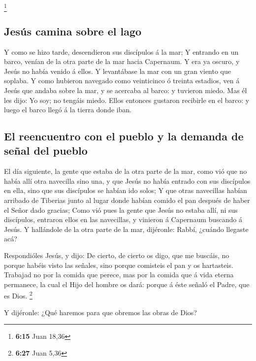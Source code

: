 \footnote{\textbf{6:15} Juan 18,36}

\hypertarget{jesuxfas-camina-sobre-el-lago}{%
\subsection{Jesús camina sobre el
lago}\label{jesuxfas-camina-sobre-el-lago}}

 Y como se hizo tarde, descendieron sus discípulos á la
mar;  Y entrando en un barco, venían de la otra parte de la
mar hacia Capernaum. Y era ya oscuro, y Jesús no había venido á ellos.
 Y levantábase la mar con un gran viento que soplaba.
 Y como hubieron navegado como veinticinco ó treinta
estadios, ven á Jesús que andaba sobre la mar, y se acercaba al barco: y
tuvieron miedo.  Mas él les dijo: Yo soy; no tengáis miedo.
 Ellos entonces gustaron recibirle en el barco: y luego el
barco llegó á la tierra donde iban.

\hypertarget{el-reencuentro-con-el-pueblo-y-la-demanda-de-seuxf1al-del-pueblo}{%
\subsection{El reencuentro con el pueblo y la demanda de señal del
pueblo}\label{el-reencuentro-con-el-pueblo-y-la-demanda-de-seuxf1al-del-pueblo}}

 El día siguiente, la gente que estaba de la otra parte de
la mar, como vió que no había allí otra navecilla sino una, y que Jesús
no había entrado con sus discípulos en ella, sino que sus discípulos se
habían ido solos;  Y que otras navecillas habían arribado
de Tiberias junto al lugar donde habían comido el pan después de haber
el Señor dado gracias;  Como vió pues la gente que Jesús no
estaba allí, ni sus discípulos, entraron ellos en las navecillas, y
vinieron á Capernaum buscando á Jesús.  Y hallándole de la
otra parte de la mar, dijéronle: Rabbí, ¿cuándo llegaste acá?

 Respondióles Jesús, y dijo: De cierto, de cierto os digo,
que me buscáis, no porque habéis visto las señales, sino porque
comisteis el pan y os hartasteis.  Trabajad no por la
comida que perece, mas por la comida que á vida eterna permanece, la
cual el Hijo del hombre os dará: porque á éste señaló el Padre, que es
Dios. \footnote{\textbf{6:27} Juan 5,36}

 Y dijéronle: ¿Qué haremos para que obremos las obras de
Dios?

